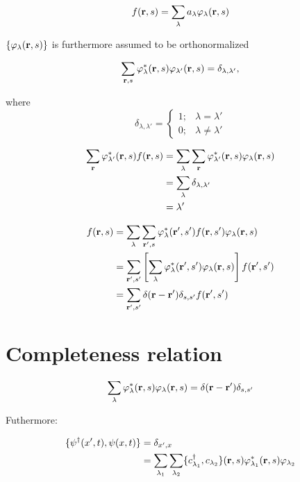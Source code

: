 \begin{equation}
	f(\vb{r},s) = \sum_\lambda a_\lambda \varphi_\lambda (\vb{r}, s)
\end{equation}

$\{ \varphi_\lambda(\vb{r},s) \}$ is furthermore assumed to be orthonormalized

\begin{equation}
	\sum_{\vb{r},s} \varphi_\lambda^* (\vb{r},s) \varphi_{\lambda'} (\vb{r},s) = \delta_{\lambda, \lambda'},
\end{equation}

where 
\[
\delta_{\lambda, \lambda'}=
\begin{cases}
	1;& \lambda = \lambda'\\
	0; & \lambda \neq \lambda' 
\end{cases}
\]

\begin{align*}
	\sum_{\vb{r}} \varphi_{\lambda'}^*(\vb{r},s) f(\vb{r},s) &= \sum_\lambda \sum_{\vb{r}} \varphi_{\lambda'}^*(\vb{r},s) \varphi_\lambda(\vb{r},s)\\
	&= \sum_\lambda \delta_{\lambda, \lambda'}\\
	&= \lambda'
\end{align*}

\begin{align*}
	f(\vb{r},s) &= \sum_\lambda \sum_{\vb{r'},s} \varphi_\lambda^* (\vb{r'},s') f(\vb{r},s') \varphi_\lambda (\vb{r},s)\\
	&= \sum_{\vb{r'},s'} \left[ \sum_\lambda \varphi_\lambda^* (\vb{r'},s') \varphi_\lambda (\vb{r},s) \right] f(\vb{r'},s') \\
	&= \sum_{\vb{r'},s'} \delta(\vb{r}-\vb{r'}) \delta_{s,s'} f(\vb{r'},s')
\end{align*}

\section{Completeness relation}

\begin{equation}
	\sum_\lambda \varphi_\lambda^* (\vb{r},s) \varphi_\lambda(\vb{r},s) = \delta(\vb{r}-\vb{r'}) \delta_{s,s'}
\end{equation}

Futhermore:

\begin{align}
	\{ \psi^\dagger(x',t), \psi(x,t) \} &= \delta_{x',x} \label{complete_1} \\
	&= \sum_{\lambda_1} \sum_{\lambda_2} \{c^{\dagger}_{\lambda_1}, c_{\lambda_2} \} (\vb{r},s)  \varphi_{\lambda_1}^* (\vb{r},s) \varphi_{\lambda_2} \nonumber
\end{align}

